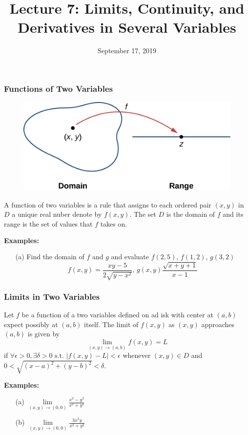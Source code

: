 \documentclass{beamer}
\title{Lecture 7: Limits, Continuity, and Derivatives in Several Variables}
\date{September 17, 2019}
\begin{document}
	
\frame{\titlepage}


\begin{frame}
\frametitle{Functions of Two Variables}
\begin{figure}
	\centering
	\includegraphics[height=.25\textheight]{function_map.jpg}\\
	\hspace*{10pt}\hbox{}
\end{figure}

A function of two variables is a rule that assigns to each ordered pair $(x,y)$ in $D$ a unique real nuber denote by $f(x,y)$. The set $D$ is the domain of $f$ and its range is the set of values that $f$ takes on.

\vspace{6pt}
\textbf{Examples:}
\begin{itemize}
	\item[(a)] Find the domain of $f$ and $g$ and evaluate $f(2,5)$, $f(1,2)$, $g(3,2)$
	$$f(x,y) = \frac{xy-5}{2 \sqrt{y-x^2}}, \, g(x,y) \frac{\sqrt{x+y+1}}{x-1}$$
\end{itemize}
\end{frame}


\begin{frame}
\frametitle{Limits in Two Variables}
Let $f$ be a function of a two variables defined on ad isk with center at $(a,b)$ expect possibly at $(a,b)$ itself. The limit of $f(x,y)$ as $(x,y)$ approaches $(a,b)$ is given by 
$$\lim\limits_{(x,y) \to (a,b)} f(x,y) = L$$
 if $\forall \epsilon > 0, \exists \delta > 0 \mbox{ s.t. } |f(x,y) - L| < \epsilon$ whenever $(x,y) \in D$ and $0 < \sqrt{(x-a)^2 + (y-b)^2} < \delta$.
 
\vspace{12pt}
\textbf{Examples:}
\begin{itemize}
	\item[(a)] $\lim\limits_{(x,y) \to (0,0)} \frac{x^2-y^2}{x^2 + y^2}$
	\item[(b)] $\lim\limits_{(x,y) \to (0,0)} \frac{3x^2y}{x^2+y^2}$
\end{itemize}
\end{frame}
\end{document}
